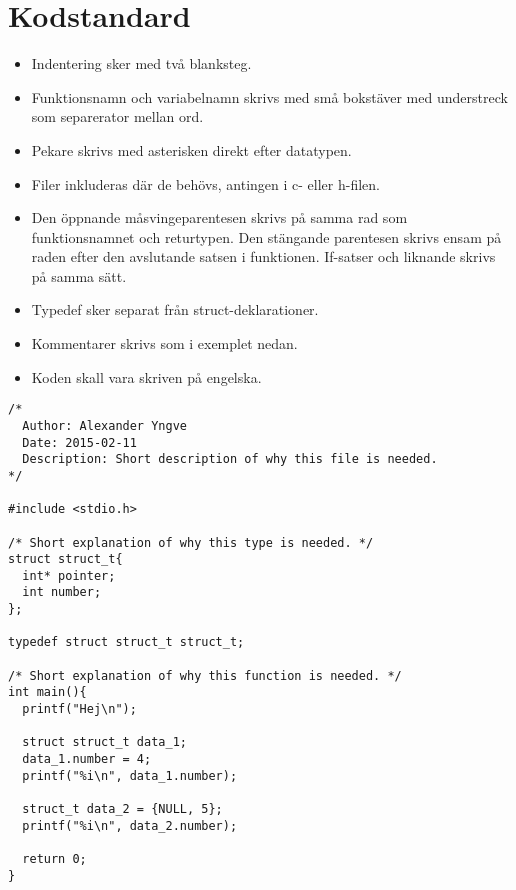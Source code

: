 
\section{Kodstandard}

\begin{itemize}
  \item Indentering sker med två blanksteg.
  \item Funktionsnamn och variabelnamn skrivs med små bokstäver med understreck som separerator mellan ord.
  \item Pekare skrivs med asterisken direkt efter datatypen.
  \item Filer inkluderas där de behövs, antingen i c- eller h-filen.
  \item Den öppnande måsvingeparentesen skrivs på samma rad som funktionsnamnet och returtypen. Den stängande parentesen skrivs ensam på raden efter den avslutande satsen i funktionen. If-satser och liknande skrivs på samma sätt.
  \item Typedef sker separat från struct-deklarationer.
  \item Kommentarer skrivs som i exemplet nedan.
  \item Koden skall vara skriven på engelska.
\end{itemize}

\begin{lstlisting}
/*
  Author: Alexander Yngve
  Date: 2015-02-11
  Description: Short description of why this file is needed.
*/

#include <stdio.h>

/* Short explanation of why this type is needed. */
struct struct_t{
  int* pointer;
  int number;
};

typedef struct struct_t struct_t;

/* Short explanation of why this function is needed. */
int main(){
  printf("Hej\n");

  struct struct_t data_1;
  data_1.number = 4;
  printf("%i\n", data_1.number);

  struct_t data_2 = {NULL, 5};
  printf("%i\n", data_2.number);

  return 0;
}
\end{lstlisting}
